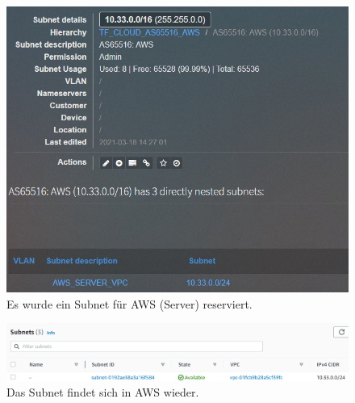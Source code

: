 \begin{figure}[h]
  \centering
  \includegraphics[scale=0.8]{Figures/subnet_aws_ipam_server.png}
  \caption{Es wurde ein Subnet für AWS (Server) reserviert.}
  \label{grafik:subnet_aws_vpc_ipam_reserved}
\end{figure}

\begin{figure}[h]
  \centering
  \includegraphics[scale=0.4]{Figures/subnet_aws_reserved_server.png}
  \caption{Das Subnet findet sich in AWS wieder.}
  \label{grafik:subnet_aws_vpc_reserved}
\end{figure}\FloatBarrier

